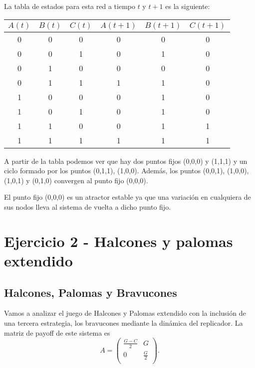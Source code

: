 \documentclass[letterpaper,12pt]{article}
\theoremstyle{plain}
\begin{document}
La tabla de estados para esta red a tiempo $t$ y $t+1$ es la siguiente:

\begin{table}[h]
    \centering
    \begin{tabular}{|c|c|c|c|c|c|}
        \hline
        $A(t)$ & $B(t)$ & $C(t)$ & $A(t+1)$ & $B(t+1)$ & $C(t+1)$ \\
        \hline
        0 & 0 & 0 & 0 & 0 & 0  \\
        0 & 0 & 1 & 0 & 1 & 0  \\
        0 & 1 & 0 & 0 & 0 & 0 \\
        0 & 1 & 1 & 1 & 1 & 0  \\
        1 & 0 & 0 & 0 & 1 & 0  \\
        1 & 0 & 1 & 0 & 1 & 0  \\
        1 & 1 & 0 & 0 & 1 & 1  \\
        1 & 1 & 1 & 1 & 1 & 1  \\
        \hline
    \end{tabular}
\end{table}

A partir de la tabla podemos ver que hay dos puntos fijos (0,0,0) y (1,1,1) y un ciclo formado por los puntos (0,1,1), (1,0,0). Además, los puntos (0,0,1), (1,0,0), (1,0,1) y (0,1,0) convergen al punto fijo (0,0,0). 

El punto fijo (0,0,0) es un atractor estable ya que una variación en cualquiera de sus nodos lleva al sistema de vuelta a dicho punto fijo.

\section*{Ejercicio 2 - Halcones y palomas extendido}

\subsection{Halcones, Palomas y Bravucones}

Vamos a analizar el juego de Halcones y Palomas extendido con la inclusión de una tercera estrategia, los bravucones mediante la dinámica del replicador. La matriz de payoff de este sistema es
\begin{equation*}
    A =
\begin{pmatrix}
\frac{G-C}{2} & G \\[4pt]
0 & \frac{G}{2} \\[4pt]
\end{pmatrix}.
\end{equation*}
\end{document}

